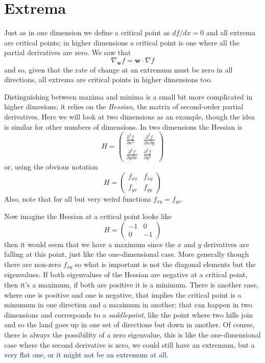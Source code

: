 \documentclass[12pt]{article}
\begin{document}
\section*{Extrema}

Just as in one dimension we define a critical point as $df/dx=0$ and
all extrema are critical points; in higher dimensions a critical point
is one where all the partial derivatives are zero. We saw that
\begin{equation}
  \nabla_{\mathbf{w}}f=\mathbf{w}\cdot\nabla{}f
\end{equation}
and so, given that the rate of change at an extremum must be zero in
all directions, all extrema are critical points in higher dimensions
too.

Distinguishing between maxima and minima is a small bit more
complicated in higher dimesions; it relies on the \textsl{Hessian},
the matrix of second-order partial derivatives. Here we will look at
two dimensions as an example, though the idea is similar for other
numbers of dimensions. In two dimensions the Hessian is
\begin{equation}
  H=\left(\begin{array}{cc}\frac{\partial^2f}{\partial x^2}&\frac{\partial^2f}{\partial x\partial y}\\
    \frac{\partial^2f}{\partial y\partial x}&\frac{\partial^2f}{\partial y^2}\end{array}\right)
\end{equation}
or, using the obvious notation
\begin{equation}
  H=\left(\begin{array}{cc}f_{xx}&f_{xy}\\f_{yx}&f_{yy}\end{array}\right)
\end{equation}
Also, note that for all but very weird functions $f_{xy}=f_{yx}$.

Now imagine the Hessian at a critical point looks like
\begin{equation}
  H=\left(\begin{array}{cc}-1&0\\0&-1\end{array}\right)
\end{equation}
then it would seem that we have a maximum since the $x$ and $y$
derivatives are falling at this point, just like the one-dimensional
case. More generally though there are non-zero $f_{xy}$ so what is
important is not the diagonal elements but the eigenvalues. If both
eigenvalues of the Hessian are negative at a critical point, then it's
a maximum, if both are positive it is a minimum. There is another
case, where one is positive and one is negative, that implies the
critical point is a minumum in one direction and a maximum in another;
that can happen in two dimensions and corresponds to a
\textsl{saddlepoint}, like the point where two hills join and so the
land goes up in one set of directions but down in another. Of course,
there is always the possibility of a zero eigenvalue, this is like the
one-dimensional case where the second derivative is zero, we could
still have an extremum, but a very flat one, or it might not be an
extremum at all.
\end{document}
